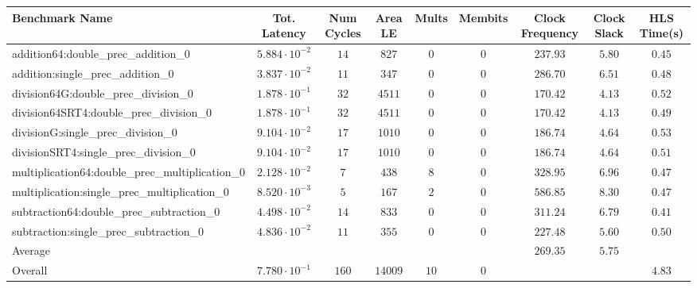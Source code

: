 \begin{tabular}{|l|c|c|c|c|c|c|c|c|}
\hline
Benchmark Name                                   & Tot. Latency            & Num Cycles & Area LE   & Mults  & Membits & Clock Frequency & Clock Slack & HLS Time(s) \\
\hline
addition64:double\_prec\_addition\_0             & $ 5.884 \cdot 10^{-2} $ & $ 14     $ & $ 827   $ & $ 0  $ & $ 0   $ & $ 237.93      $ & $ 5.80    $ & $ 0.45    $ \\
addition:single\_prec\_addition\_0               & $ 3.837 \cdot 10^{-2} $ & $ 11     $ & $ 347   $ & $ 0  $ & $ 0   $ & $ 286.70      $ & $ 6.51    $ & $ 0.48    $ \\
division64G:double\_prec\_division\_0            & $ 1.878 \cdot 10^{-1} $ & $ 32     $ & $ 4511  $ & $ 0  $ & $ 0   $ & $ 170.42      $ & $ 4.13    $ & $ 0.52    $ \\
division64SRT4:double\_prec\_division\_0         & $ 1.878 \cdot 10^{-1} $ & $ 32     $ & $ 4511  $ & $ 0  $ & $ 0   $ & $ 170.42      $ & $ 4.13    $ & $ 0.49    $ \\
divisionG:single\_prec\_division\_0              & $ 9.104 \cdot 10^{-2} $ & $ 17     $ & $ 1010  $ & $ 0  $ & $ 0   $ & $ 186.74      $ & $ 4.64    $ & $ 0.53    $ \\
divisionSRT4:single\_prec\_division\_0           & $ 9.104 \cdot 10^{-2} $ & $ 17     $ & $ 1010  $ & $ 0  $ & $ 0   $ & $ 186.74      $ & $ 4.64    $ & $ 0.51    $ \\
multiplication64:double\_prec\_multiplication\_0 & $ 2.128 \cdot 10^{-2} $ & $ 7      $ & $ 438   $ & $ 8  $ & $ 0   $ & $ 328.95      $ & $ 6.96    $ & $ 0.47    $ \\
multiplication:single\_prec\_multiplication\_0   & $ 8.520 \cdot 10^{-3} $ & $ 5      $ & $ 167   $ & $ 2  $ & $ 0   $ & $ 586.85      $ & $ 8.30    $ & $ 0.47    $ \\
subtraction64:double\_prec\_subtraction\_0       & $ 4.498 \cdot 10^{-2} $ & $ 14     $ & $ 833   $ & $ 0  $ & $ 0   $ & $ 311.24      $ & $ 6.79    $ & $ 0.41    $ \\
subtraction:single\_prec\_subtraction\_0         & $ 4.836 \cdot 10^{-2} $ & $ 11     $ & $ 355   $ & $ 0  $ & $ 0   $ & $ 227.48      $ & $ 5.60    $ & $ 0.50    $ \\
\hline
Average                                          & $                     $ & $        $ & $       $ & $    $ & $     $ & $ 269.35      $ & $ 5.75    $ & $         $ \\
\hline
Overall                                          & $ 7.780 \cdot 10^{-1} $ & $ 160    $ & $ 14009 $ & $ 10 $ & $ 0   $ & $             $ & $         $ & $ 4.83    $ \\
\hline
\end{tabular}
